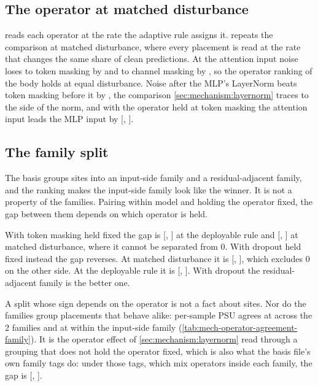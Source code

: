 \subsection{The operator at matched disturbance}
\label{app:operators-matched}

 reads each operator at the rate the adaptive rule assigns it.  repeats the comparison at matched disturbance, where every placement is read at the rate that changes the same share of clean predictions. At the attention input noise loses to token masking by \GaussianMinusTokenMaskAttentionNorm{} and to channel masking by \GaussianMinusChannelMaskAttentionNorm{}, so the operator ranking of the body holds at equal disturbance. Noise after the MLP's LayerNorm beats token masking before it by \GaussianMinusTokenMaskMlp{}, the comparison \cref{sec:mechanism:layernorm} traces to the side of the norm, and with the operator held at token masking the attention input leads the MLP input by \AttentionInputMinusMlpInputTokenMask{} [\AttentionInputMinusMlpInputTokenMaskLow{}, \AttentionInputMinusMlpInputTokenMaskHigh{}].


\FloatBarrier


\subsection{The family split}
\label{sec:results:family}

The basis groups sites into an input-side family and a residual-adjacent family, and the ranking makes the input-side family look like the winner. It is not a property of the families. Pairing within model and holding the operator fixed, the gap between them depends on which operator is held.

With token masking held fixed the gap is \FamilyGapAdaptive{} [\FamilyGapAdaptiveLow{}, \FamilyGapAdaptiveHigh{}] at the deployable rule and \FamilyGapMatched{} [\FamilyGapMatchedLow{}, \FamilyGapMatchedHigh{}] at matched disturbance, where it cannot be separated from 0. With dropout held fixed instead the gap reverses. At matched disturbance it is \FamilyGapDropoutMatched{} [\FamilyGapDropoutMatchedLow{}, \FamilyGapDropoutMatchedHigh{}], which excludes 0 on the other side. At the deployable rule it is \FamilyGapDropoutAdaptive{} [\FamilyGapDropoutAdaptiveLow{}, \FamilyGapDropoutAdaptiveHigh{}]. With dropout the residual-adjacent family is the better one.

A split whose sign depends on the operator is not a fact about sites. Nor do the families group placements that behave alike: per-sample PSU agrees at \AgreementAcrossFamiliesClean{} across the 2 families and at \AgreementWithinInputSideClean{} within the input-side family (\cref{tab:mech-operator-agreement-family}). It is the operator effect of \cref{sec:mechanism:layernorm} read through a grouping that does not hold the operator fixed, which is also what the basis file's own family tags do: under those tags, which mix operators inside each family, the gap is \FamilyGapConfoundedMatched{} [\FamilyGapConfoundedMatchedLow{}, \FamilyGapConfoundedMatchedHigh{}].

